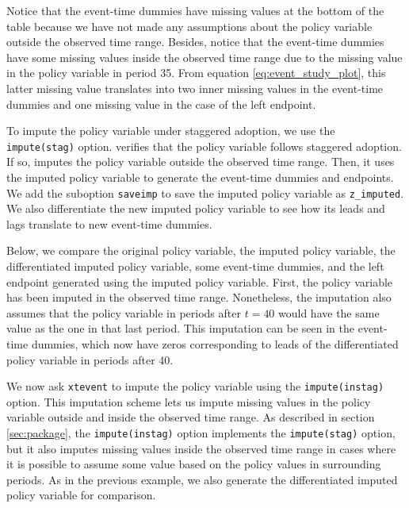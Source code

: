 \documentclass[12pt]{article}
\begin{document}
Notice that the event-time dummies have missing values at the bottom of the table because we have not made any assumptions about the policy variable outside the observed time range.
Besides, notice that the event-time dummies have some missing values inside the observed time range due to the missing value in the policy variable in period 35.
From equation \eqref{eq:event_study_plot}, this latter missing value translates into two inner missing values in the event-time dummies and one missing value in the case of the left endpoint.

To impute the policy variable under staggered adoption, we use the \texttt{impute(stag)} option.
\xtevent verifies that the policy variable follows staggered adoption.
If so, \xtevent imputes the policy variable outside the observed time range.
Then, it uses the imputed policy variable to generate the event-time dummies and endpoints.
We add the suboption \texttt{saveimp} to save the imputed policy variable as \texttt{z\_imputed}.
We also differentiate the new imputed policy variable to see how its leads and lags translate to new event-time dummies.

\begin{stlog}
	\nullskip
\end{stlog}

Below, we compare the original policy variable, the imputed policy variable, the differentiated imputed policy variable, some event-time dummies, and the left endpoint generated using the imputed policy variable.
First, the policy variable has been imputed in the observed time range.
Nonetheless, the imputation also assumes that the policy variable in periods after $t=40$ would have the same value as the one in that last period.
This imputation can be seen in the event-time dummies, which now have zeros corresponding to leads of the differentiated policy variable in periods after 40.

\begin{stlog}
	\nullskip
\end{stlog}

We now ask \texttt{xtevent} to impute the policy variable using the \texttt{impute(instag)} option.
This imputation scheme lets us impute missing values in the policy variable outside and inside the observed time range.
As described in section \ref{sec:package}, the \texttt{impute(instag)} option implements the \texttt{impute(stag)} option, but it also imputes missing values inside the observed time range in cases where it is possible to assume some value based on the policy values in surrounding periods.
As in the previous example, we also generate the differentiated imputed policy variable for comparison.
\end{document}
